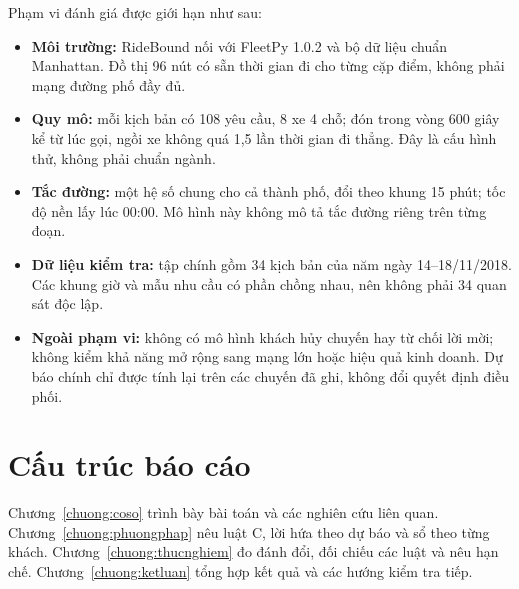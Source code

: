 Phạm vi đánh giá được giới hạn như sau:
\begin{itemize}[leftmargin=0.7cm,itemsep=3pt,topsep=3pt]
\item \textbf{Môi trường:} RideBound nối với FleetPy 1.0.2 và bộ dữ liệu chuẩn Manhattan.
Đồ thị 96 nút có sẵn thời gian đi cho từng cặp điểm, không phải mạng đường phố đầy đủ.
\item \textbf{Quy mô:} mỗi kịch bản có 108 yêu cầu, 8 xe 4 chỗ; đón trong vòng 600 giây kể từ lúc gọi,
ngồi xe không quá 1,5 lần thời gian đi thẳng. Đây là cấu hình thử, không phải chuẩn ngành.
\item \textbf{Tắc đường:} một hệ số chung cho cả thành phố, đổi theo khung 15 phút; tốc độ nền lấy lúc 00:00.
Mô hình này không mô tả tắc đường riêng trên từng đoạn.
\item \textbf{Dữ liệu kiểm tra:} tập chính gồm 34 kịch bản của năm ngày 14--18/11/2018.
Các khung giờ và mẫu nhu cầu có phần chồng nhau, nên không phải 34 quan sát độc lập.
\item \textbf{Ngoài phạm vi:} không có mô hình khách hủy chuyến hay từ chối lời mời; không kiểm khả năng mở rộng
sang mạng lớn hoặc hiệu quả kinh doanh. Dự báo chính chỉ được tính lại trên các chuyến đã ghi, không đổi quyết định điều phối.
\end{itemize}

\section{Cấu trúc báo cáo}
\label{muc:c1-cautruc}

Chương~\ref{chuong:coso} trình bày bài toán và các nghiên cứu liên quan.
Chương~\ref{chuong:phuongphap} nêu luật C, lời hứa theo dự báo và sổ theo từng khách.
Chương~\ref{chuong:thucnghiem} đo đánh đổi, đối chiếu các luật và nêu hạn chế.
Chương~\ref{chuong:ketluan} tổng hợp kết quả và các hướng kiểm tra tiếp.
